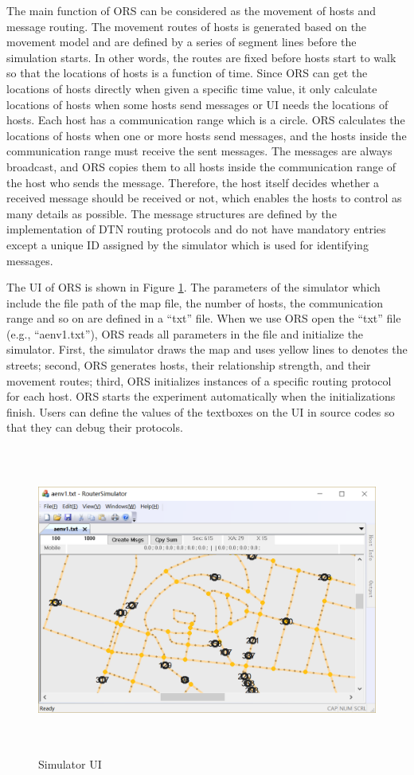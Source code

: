 The main function of ORS can be considered as the movement of hosts and message routing. The movement routes of hosts is generated based on the movement model and are defined by a series of segment lines before the simulation starts. In other words, the routes are fixed before hosts start to walk so that the locations of hosts is a function of time. Since ORS can get the locations of hosts directly when given a specific time value, it only calculate locations of hosts when some hosts send messages or UI needs the locations of hosts. Each host has a communication range which is a circle. ORS calculates the locations of hosts when one or more hosts send messages, and the hosts inside the communication range must receive the sent messages. The messages are always broadcast, and ORS copies them to all hosts inside the communication range of the host who sends the message. Therefore, the host itself decides whether a received message should be received or not, which enables the hosts to control as many details as possible. The message structures are defined by the implementation of DTN routing protocols and do not have mandatory entries except a unique ID assigned by the simulator which is used for identifying messages. 

The UI of ORS is shown in Figure \ref{fig:SimulatorUI}. The parameters of the simulator which include the file path of the map file, the number of hosts, the communication range and so on are defined in a ``txt'' file. When we use ORS open the ``txt'' file (e.g., ``aenv1.txt''), ORS reads all parameters in the file and initialize the simulator. First, the simulator draws the map and uses yellow lines to denotes the streets; second, ORS generates hosts, their relationship strength, and their movement routes; third, ORS initializes instances of a specific routing protocol for each host. ORS starts the experiment automatically when the initializations finish. Users can define the values of the textboxes on the UI in source codes so that they can debug their protocols.

\begin{figure} [hbtp]
  \centering 
  \includegraphics[height=4in]{figures/simulator.png}
  \caption{Simulator UI} 
  \label{fig:SimulatorUI} %
\end{figure}

